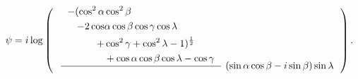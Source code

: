 \documentclass[preview]{standalone}
\begin{document}
\begin{align*}
\
            \psi = i \log\left( \
                \vcenter{\hbox{$\displaystyle \
                \frac{ \
                    \begin{split} \
                        -(\cos^{2}{\alpha } &\cos^{2}{\beta } \\ \
                        - 2 \cos&{\alpha } \cos{\beta } \cos{\gamma } \cos{\lambda } \\ \
                        + &\cos^{2}{\gamma } + \cos^{2}{\lambda } - 1)^{\frac{1}{2}} \\ \
                        &+ \cos{\alpha } \cos{\beta } \cos{\lambda } - \cos{\gamma } \
                    \end{split} \
                } \
                { \
                    (\sin{\alpha } \cos{\beta } - i \sin{\beta }) \sin{\lambda } \
                }$}} \
            \right). \
\end{align*}
\end{document}
